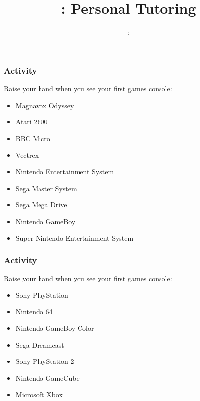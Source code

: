 \usepackage[T1]{fontenc}
\usepackage{../../beamerthemeFalmouthGamesAcademy}
\usepackage{multimedia}
\graphicspath{ {../../} }


\usepackage[normalem]{ulem}
\usepackage{wasysym}

\usepackage{pdfpages}

\usetikzlibrary{arrows,automata}




\title{\sessionnumber: Personal Tutoring}
\subtitle{\modulecode: \moduletitle}

\frame{\titlepage} 

\begin{frame}
	\frametitle{Activity}
	
	Raise your hand when you see your first games console:  \pause
	
	\begin{itemize}
		\item Magnavox Odyssey \pause
		\item Atari 2600 \pause
		\item BBC Micro \pause
		\item Vectrex \pause
		\item Nintendo Entertainment System \pause
		\item Sega Master System \pause
		\item Sega Mega Drive \pause
		\item Nintendo GameBoy \pause
		\item Super Nintendo Entertainment System

	\end{itemize}
\end{frame}

\begin{frame}
	\frametitle{Activity}
	
	Raise your hand when you see your first games console:
	
	\begin{itemize}
		\item Sony PlayStation \pause
		\item Nintendo 64 \pause
		\item Nintendo GameBoy Color \pause
		\item Sega Dreamcast \pause
		\item Sony PlayStation 2 \pause
		\item Nintendo GameCube \pause
		\item Microsoft Xbox \pause
	\end{itemize}
\end{frame}

